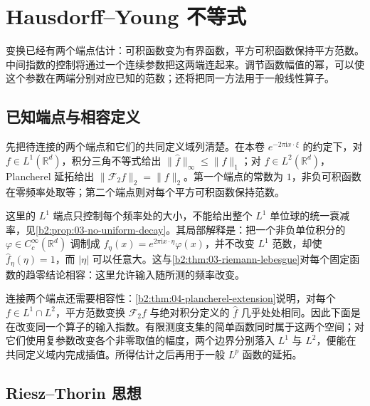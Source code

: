 \section{Hausdorff--Young 不等式}
\label{b2:sec:0402}

变换已经有两个端点估计：可积函数变为有界函数，平方可积函数保持平方范数。中间指数的控制将通过一个连续参数把这两端连起来。调节函数幅值的幂，可以使这个参数在两端分别对应已知的范数；还将把同一方法用于一般线性算子。

\subsection{已知端点与相容定义}
\label{b2:subsec:04-fourier-endpoints}
\label{b2:subsec:040201}
\label{b2:subsec:040202}

先把待连接的两个端点和它们的共同定义域列清楚。在本卷 \(e^{-2\pi\mathrm ix\cdot\xi}\) 的约定下，对 \(f\in L^1(\mathbb R^d)\)，积分三角不等式给出 \(\|\widehat f\|_\infty\leq\|f\|_1\)；对 \(f\in L^2(\mathbb R^d)\)，Plancherel 延拓给出 \(\|\mathcal F_2f\|_2=\|f\|_2\)。第一个端点的常数为 \(1\)，非负可积函数在零频率处取等；第二个端点则对每个平方可积函数保持范数。

\ProseParagraphBreak

这里的 \(L^1\) 端点只控制每个频率处的大小，不能给出整个 \(L^1\) 单位球的统一衰减率，见\cref{b2:prop:03-no-uniform-decay}。其局部解释是：把一个非负单位积分的 \(\varphi\in C_c^\infty(\mathbb R^d)\) 调制成 \(f_\eta(x)=e^{2\pi\mathrm ix\cdot\eta}\varphi(x)\)，并不改变 \(L^1\) 范数，却使 \(\widehat f_\eta(\eta)=1\)，而 \(|\eta|\) 可以任意大。这与\cref{b2:thm:03-riemann-lebesgue}对每个固定函数的趋零结论相容：这里允许输入随所测的频率改变。

\ProseParagraphBreak

连接两个端点还需要相容性：\cref{b2:thm:04-plancherel-extension}说明，对每个 \(f\in L^1\cap L^2\)，平方范数变换 \(\mathcal F_2f\) 与绝对积分定义的 \(\widehat f\) 几乎处处相同。因此下面是在改变同一个算子的输入指数。有限测度支集的简单函数同时属于这两个空间；对它们使用复参数改变各个非零取值的幅度，两个边界分别落入 \(L^1\) 与 \(L^2\)，便能在共同定义域内完成插值。所得估计之后再用于一般 \(L^p\) 函数的延拓。

\subsection{Riesz--Thorin 思想}
\label{b2:subsec:04-complex-interpolation}
\label{b2:subsec:040203}

